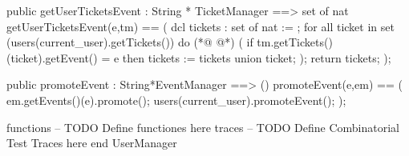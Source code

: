 \begin{vdmpp}[breaklines=true]
 public getUserTicketsEvent : String * TicketManager ==> set of nat
 getUserTicketsEvent(e,tm) == (
  dcl tickets : set of nat := {};
  for all ticket in set (users(current_user).getTickets()) do 
(*@
\label{promoteEvent:75}
@*)
  (
   if tm.getTickets()(ticket).getEvent() = e
    then tickets := tickets union {ticket};
  );
  return tickets;
 );
 
 public promoteEvent : String*EventManager ==> ()
 promoteEvent(e,em) == (
  em.getEvents()(e).promote();
  users(current_user).promoteEvent();
 );
 
 
 
functions
-- TODO Define functiones here
traces
-- TODO Define Combinatorial Test Traces here
end UserManager
\end{vdmpp}
